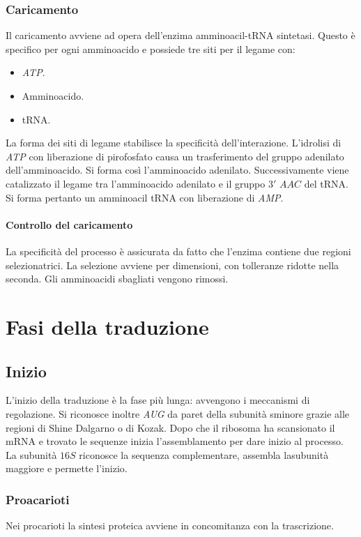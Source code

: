 		\subsubsection{Caricamento}
		Il caricamento avviene ad opera dell'enzima amminoacil-tRNA sintetasi.
		Questo \`e specifico per ogni amminoacido e possiede tre siti per il legame con:
		\begin{multicols}{3}
			\begin{itemize}
				\item \emph{ATP}.
				\item Amminoacido.
				\item tRNA.
			\end{itemize}
		\end{multicols}
		La forma dei siti di legame stabilisce la specificit\`a dell'interazione.
		L'idrolisi di \emph{ATP} con liberazione di pirofosfato causa un trasferimento del gruppo adenilato dell'amminoacido.
		Si forma cos\`i l'amminoacido adenilato.
		Successivamente viene catalizzato il legame tra l'amminoacido adenilato e il gruppo $3'$ $AAC$ del tRNA.
		Si forma pertanto un amminoacil tRNA con liberazione di \emph{AMP}.

			\paragraph{Controllo del caricamento}
			La specificit\`a del processo \`e assicurata da fatto che l'enzima contiene due regioni selezionatrici.
			La selezione avviene per dimensioni, con tolleranze ridotte nella seconda.
			Gli amminoacidi sbagliati vengono rimossi.

\section{Fasi della traduzione}

	\subsection{Inizio}
	L'inizio della traduzione \`e la fase pi\`u lunga: avvengono i meccanismi di regolazione.
	Si riconosce inoltre \emph{AUG} da paret della subunit\`a sminore grazie alle regioni di Shine Dalgarno o di Kozak.
	Dopo che il ribosoma ha scansionato il mRNA e trovato le sequenze inizia l'assemblamento per dare inizio al processo.
	La subunit\`a $16S$ riconosce la sequenza complementare, assembla lasubunit\`a maggiore e permette l'inizio.

		\subsubsection{Proacarioti}
		Nei procarioti la sintesi proteica avviene in concomitanza con la trascrizione.


